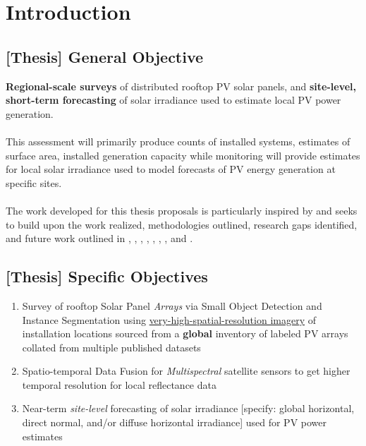 \section{Introduction}



\subsection{[Thesis] General Objective}
    \vspace{0.5cm}
    
    \textbf{Regional-scale surveys} of distributed rooftop PV solar panels, and \textbf{site-level, short-term forecasting} of solar irradiance used to estimate local PV power generation. \\
    \\
    This assessment will primarily produce counts of installed systems, estimates of surface area, installed generation capacity while monitoring will provide estimates for local solar irradiance used to model forecasts of PV energy generation at specific sites. \\
    \\ 
    The work developed for this thesis proposals is particularly inspired by and seeks to build upon the work realized, methodologies outlined, research gaps identified, and future work outlined in \cite{maxar_germany_pv_dataset}, \cite{Hu_solar_array_pitfalls_2022}, \cite{de-Hoog_sota_survey_2020}, \cite{Bansal_ssl_nowcasting_2022}, \cite{He_universal_pv_spectral_index_2024}, \cite{Jiang_rooftop_pv_assessment_2022}, \cite{Tremenbert_Kasmi_pyPV_roof_2023}, and \cite{Yu_deep_solar_2018}.

\subsection{[Thesis] Specific Objectives}
    \begin{enumerate}
        \item Survey of rooftop Solar Panel \textit{Arrays} via Small Object Detection and Instance Segmentation using \href{https://www.maxar.com/maxar-intelligence/constellation}{very-high-spatial-resolution imagery} of installation locations sourced from a \textbf{global} inventory of labeled PV arrays collated from multiple published datasets 
        \item Spatio-temporal Data Fusion for \textit{Multispectral} satellite sensors to get higher temporal resolution for local reflectance data 
        \item Near-term \textit{site-level} forecasting of solar irradiance [specify: global horizontal, direct normal, and/or diffuse horizontal irradiance] used for PV power estimates
    \end{enumerate}
    
